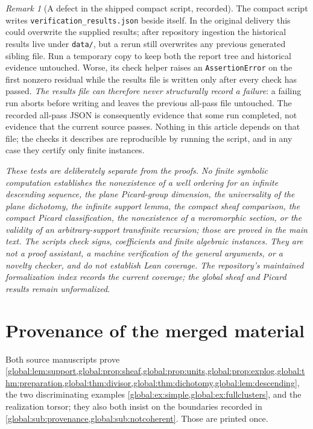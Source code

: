 \documentclass[11pt,letterpaper]{article}
\theoremstyle{definition}
\theoremstyle{remark}
\newtheorem{remark}[remark]{Remark}
\numberwithin{equation}{section}
\begin{document}
\begin{remark}[A defect in the shipped compact script, recorded]\label{global:rem:scriptdefect}
The compact script writes \texttt{verification\_results.json} beside itself. In the original delivery this could overwrite the supplied results; after repository ingestion the historical results live under \texttt{data/}, but a rerun still overwrites any previous generated sibling file. Run a temporary copy to keep both the report tree and historical evidence untouched. Worse, its check helper raises an \texttt{AssertionError} on the first nonzero residual while the results file is written only after every check has passed. \emph{The results file can therefore never structurally record a failure}: a failing run aborts before writing and leaves the previous all-pass file untouched. The recorded all-pass JSON is consequently evidence that some run completed, not evidence that the current source passes. Nothing in this article depends on that file; the checks it describes are reproducible by running the script, and in any case they certify only finite instances.
\end{remark}

\emph{These tests are deliberately separate from the proofs. No finite symbolic computation establishes the nonexistence of a well ordering for an infinite descending sequence, the plane Picard-group dimension, the universality of the plane dichotomy, the infinite support lemma, the compact sheaf comparison, the compact Picard classification, the nonexistence of a meromorphic section, or the validity of an arbitrary-support transfinite recursion; those are proved in the main text. The scripts check signs, coefficients and finite algebraic instances. They are not a proof assistant, a machine verification of the general arguments, or a novelty checker, and do not establish Lean coverage. The repository's maintained formalization index records the current coverage; the global sheaf and Picard results remain unformalized.}

\section{Provenance of the merged material}\label{global:app:provenance}

Both source manuscripts prove \cref{global:lem:support,global:prop:sheaf,global:prop:units,global:prop:explog,global:thm:preparation,global:thm:divisor,global:thm:dichotomy,global:lem:descending}, the two discriminating examples \cref{global:ex:simple,global:ex:fullclusters}, and the realization torsor; they also both insist on the boundaries recorded in \cref{global:sub:provenance,global:sub:notcoherent}. Those are printed once.
\end{document}
